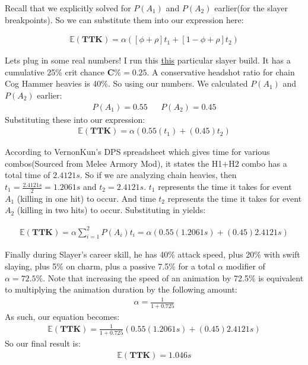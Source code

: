 \documentclass{article}
\begin{document}
Recall that we explicitly solved for $P(A_1)$ and $P(A_2)$ earlier(for the slayer breakpoints). So we can substitute them into our expression here:

\begin{align*}
\mathbb{E}(\mathbf{TTK}) = \alpha ([\phi + \rho] t_1 + [1-\phi+ \rho] t_2)
\end{align*}

Lets plug in some real numbers! I run this \href{https://www.ranalds.gift/build/IKtCgpNH7INsPonDHAHZ/view}{this} particular slayer build. It has a cumulative 25\% crit chance $\mathbf{C\%} = 0.25$. A conservative headshot ratio for chain Cog Hammer heavies is 40\%. So using our numbers. We calculated $P(A_1)$ and $P(A_2)$ earlier:
\begin{align*}
P(A_1) = 0.55 && P(A_2) = 0.45
\end{align*}
Substituting these into our expression:
\begin{align*}
\mathbb{E}(\mathbf{TTK}) = \alpha (0.55 (t_1) + (0.45) t_2)
\end{align*}

According to VernonKun's DPS spreadsheet which gives time for various combos(Sourced from Melee Armory Mod), it states the H1+H2 combo has a total time of $2.4121 s$. So if we are analyzing chain heavies, then $t_1=\tfrac{2.4121 s}{2}=1.2061 s$ and $t_2 = 2.4121 s$. $t_1$ represents the time it takes for event $A_1$ (killing in one hit) to occur. And time $t_2$ represents the time it takes for event $A_2$ (killing in two hits) to occur. Substituting in yields:

\begin{align*}
\mathbb{E}(\mathbf{TTK}) = \alpha \sum_{i=1}^{2} P(A_i) t_i = \alpha (0.55 (1.2061 s) + (0.45) 2.4121 s)
\end{align*}

Finally during Slayer's career skill, he has 40\% attack speed, plus 20\% with swift slaying, plus 5\% on charm, plus a passive 7.5\% for a total $\alpha$ modifier of $\alpha=72.5\%$. Note that increasing the speed of an animation by 72.5\% is equivalent to multiplying the animation duration by the following amount:
\begin{align*}
\alpha = \frac{1}{1+0.725}
\end{align*}
As such, our equation becomes:
\begin{align*}
\mathbb{E}(\mathbf{TTK}) = \tfrac{1}{1+0.725} (0.55 (1.2061 s) + (0.45) 2.4121 s)
\end{align*}
So our final result is:
\begin{align*}
\mathbb{E}(\mathbf{TTK}) = 1.046 s
\end{align*}
\end{document}
